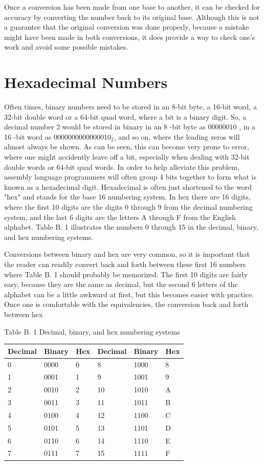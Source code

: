 \documentclass[10pt]{book}
\begin{document}
Once a conversion has been made from one base to another, it can be checked for accuracy by converting the number back to its original base. Although this is not a guarantee that the original conversion was done properly, because a mistake might have been made in both conversions, it does provide a way to check one's work and avoid some possible mistakes.

\section{Hexadecimal Numbers}
Often times, binary numbers need to be stored in an 8-bit byte, a 16-bit word, a 32-bit double word or a 64-bit quad word, where a bit is a binary digit. So, a decimal number 2 would be stored in binary in an 8 -bit byte as 00000010 , in a 16 -bit word as $0000000000000010_{2}$, and so on, where the leading zeros will almost always be shown. As can be seen, this can become very prone to error, where one might accidently leave off a bit, especially when dealing with 32-bit double words or 64-bit quad words. In order to help alleviate this problem, assembly language programmers will often group 4 bits together to form what is known as a hexadecimal digit. Hexadecimal is often just shortened to the word "hex" and stands for the base 16 numbering system. In hex there are 16 digits, where the first 10 digits are the digits 0 through 9 from the decimal numbering system, and the last 6 digits are the letters A through F from the English alphabet. Table B. 1 illustrates the numbers 0 through 15 in the decimal, binary, and hex numbering systems.

Conversions between binary and hex are very common, so it is important that the reader can readily convert back and forth between these first 16 numbers where Table B. 1 should probably be memorized. The first 10 digits are fairly easy, because they are the same as decimal, but the second 6 letters of the alphabet can be a little awkward at first, but this becomes easier with practice. Once one is comfortable with the equivalencies, the conversion back and forth between hex

Table B. 1 Decimal, binary, and hex numbering systems

\begin{center}
\begin{tabular}{|l|l|l|l|l|l|}
\hline
Decimal & Binary & Hex & Decimal & Binary & Hex \\
\hline
0 & 0000 & 0 & 8 & 1000 & 8 \\
\hline
1 & 0001 & 1 & 9 & 1001 & 9 \\
\hline
2 & 0010 & 2 & 10 & 1010 & A \\
\hline
3 & 0011 & 3 & 11 & 1011 & B \\
\hline
4 & 0100 & 4 & 12 & 1100 & C \\
\hline
5 & 0101 & 5 & 13 & 1101 & D \\
\hline
6 & 0110 & 6 & 14 & 1110 & E \\
\hline
7 & 0111 & 7 & 15 & 1111 & F \\
\hline
\end{tabular}
\end{center}
\end{document}
